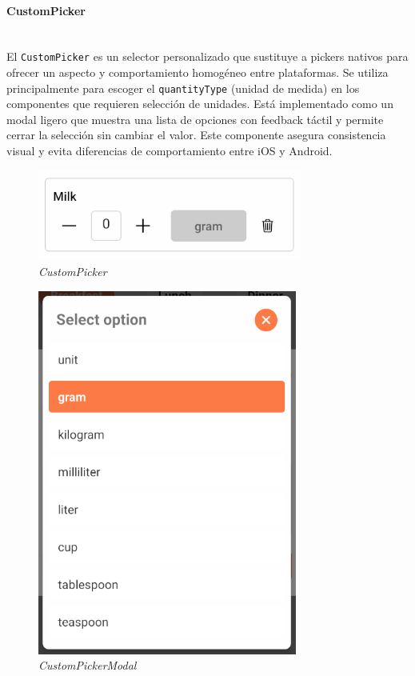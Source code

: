 \documentclass[twoside, openright, 11pt]{report}
\begin{document}
					

				\paragraph{CustomPicker\\\\}
					El \texttt{CustomPicker} es un selector personalizado que sustituye a pickers nativos para ofrecer un aspecto y comportamiento homogéneo entre plataformas. Se utiliza principalmente para escoger el \texttt{quantityType} (unidad de medida) en los componentes que requieren selección de unidades. Está implementado como un modal ligero que muestra una lista de opciones con feedback táctil y permite cerrar la selección sin cambiar el valor. Este componente asegura consistencia visual y evita diferencias de comportamiento entre iOS y Android.
						
					\begin{figure}[H]
						\centering
						\includegraphics{imagenes/CustomPicker.png}
						\caption{\textit{CustomPicker}}
						\label{fig:CustomPicker}
					\end{figure}
					
					\begin{figure}[H]
						\centering
						\includegraphics{imagenes/CustomPickerModal}
						\caption{\textit{CustomPickerModal}}
						\label{fig:CustomPickerModal}
					\end{figure}
\end{document}
